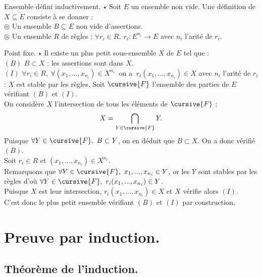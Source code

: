 \documentclass[french, 11pt]{article}
\begin{document}
\begin{defi}{Ensemble défini inductivement. $\star$}{}
    Soit $E$ un ensemble non vide. Une définition de $X \subseteq E$ consiste à se donner :\\
    \hspace*{2em}$\circledcirc$ Un ensemble $B\subseteq E$ non vide d'assertions.\\
    \hspace*{2em}$\circledcirc$ Un ensemble $R$ de règles : $\forall r_i \in R, ~ r_i : E^{n_i} \to E$ avec $n_i$ l'arité de $r_i$.
\end{defi}

\begin{thm}{Point fixe. $\star$}{}
    Il existe un plus petit sous-ensemble $X$ de $E$ tel que :\\
    \hspace*{2em}$(B)$ $B \subset X$ : les assertions sont dans $X$.\\
    \hspace*{2em}$(I)$ $\forall r_i \in R, ~ \forall (x_1, ..., x_{n_i}) \in X^{n_i} ~ $ on a $ ~ r_i(x_1,...,x_{n_i})\in X$ avec $n_i$ l'arité de $r_i$ : $X$ est stable par les règles.
    \tcblower
    Soit $\cursive{F}$ l'ensemble des parties de $E$ vérifiant $(B)$ et $(I)$.\\
    On considère $X$ l'intersection de tous les éléments de $\cursive{F}$ :
    \begin{equation*}
        X = \bigcap_{Y\in\cursive{F}}Y.
    \end{equation*}
    Puisque $\forall Y\in \cursive{F}, ~ B\subset Y$, on en déduit que $B \subset X$. On a donc vérifié $(B)$.\\
    Soit $r_i\in R$ et $(x_1, ..., x_{n_i})\in X^{n_i}$.\\
    Remarquons que $\forall Y \in \cursive{F}, ~ x_1, ..., x_{n_i} \in Y$, or les $Y$ sont stables par les règles d'où $\forall Y \in \cursive{F}, ~ r_i(x_1, ..., x_{n_i})\in Y$.\\
    Puisque $X$ est leur intersection, $r_i(x_1, ..., x_{n_i})\in X$ et $X$ vérifie alors $(I)$.\\
    C'est donc le plus petit ensemble vérifiant $(B)$ et $(I)$ par construction.
\end{thm}

\section{Preuve par induction.}
\subsection{Théorème de l'induction.}
\end{document}
